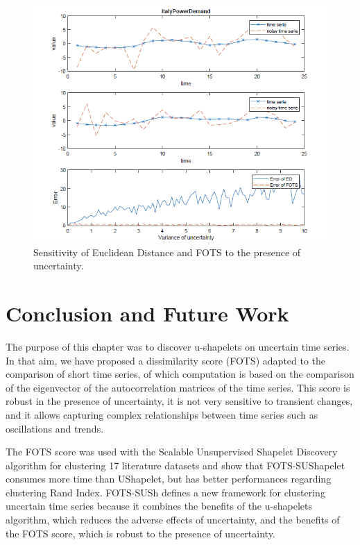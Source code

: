 \begin{figure}[h]
\centering
 \includegraphics[scale=0.80]{images/noisy_time_series}
\caption{Sensitivity of Euclidean Distance and FOTS to the presence of uncertainty.}
\label{timecomparison22}
\end{figure}


\section[Conclusion]{Conclusion and Future Work}
The purpose of this chapter was to discover u-shapelets on uncertain time series. In that aim, we have proposed a dissimilarity score (FOTS) adapted to the comparison of short time series, of which computation is based on the comparison of the eigenvector of the autocorrelation matrices of the time series. This score is robust in the presence of uncertainty, it is not very sensitive to transient changes, and it allows capturing complex relationships between time series such as oscillations and trends. 


The FOTS score was used with the Scalable Unsupervised Shapelet Discovery algorithm for clustering 17 literature datasets and show that FOTS-SUShapelet consumes more time than UShapelet, but has better performances regarding clustering Rand Index. FOTS-SUSh defines a new framework for clustering uncertain time series because it combines the benefits of the u-shapelets algorithm, which reduces the adverse effects of uncertainty, and the benefits of the FOTS score, which is robust to the presence of uncertainty. 

